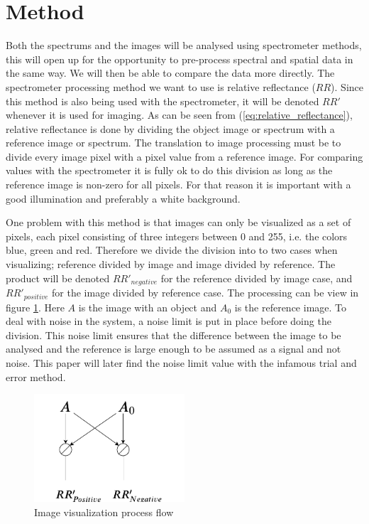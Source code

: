 \section{Method}
Both the spectrums and the images will be analysed using spectrometer methods, this will open up for the opportunity to pre-process spectral and spatial data in the same way. We will then be able to compare the data more directly. The spectrometer processing method we want to use is relative reflectance ($RR$). Since this method is also being used with the spectrometer, it will be denoted $RR'$ whenever it is used for imaging. As can be seen from (\ref{eq:relative_reflectance}), relative reflectance is done by dividing the object image or spectrum with a reference image or spectrum. The translation to image processing must be to divide every image pixel with a pixel value from a reference image. For comparing values with the spectrometer it is fully ok to do this division as long as the reference image is non-zero for all pixels. For that reason it is important with a good illumination and preferably a white background. 


One problem with this method is that images can only be visualized as a set of pixels, each pixel consisting of three integers between 0 and 255, i.e. the colors blue, green and red. Therefore we divide the division into to two cases when visualizing; reference divided by image and image divided by reference. The product will be denoted $RR'_{negative}$ for the reference divided by image case, and $RR'_{positive}$ for the image divided by reference case. The processing can be view in figure \ref{fig:image_visualization_program_flow}. Here $A$ is the image with an object and $A_0$ is the reference image. To deal with noise in the system, a noise limit is put in place before doing the division. This noise limit ensures that the difference between the image to be analysed and the reference is large enough to be assumed as a signal and not noise. This paper will later find the noise limit value with the infamous trial and error method. 

\begin{figure}[h]
    \centering
    \includegraphics[width=0.5\textwidth]{figures/image_program_flow.pdf}
    \caption{Image visualization process flow}
    \label{fig:image_visualization_program_flow}
\end{figure}


